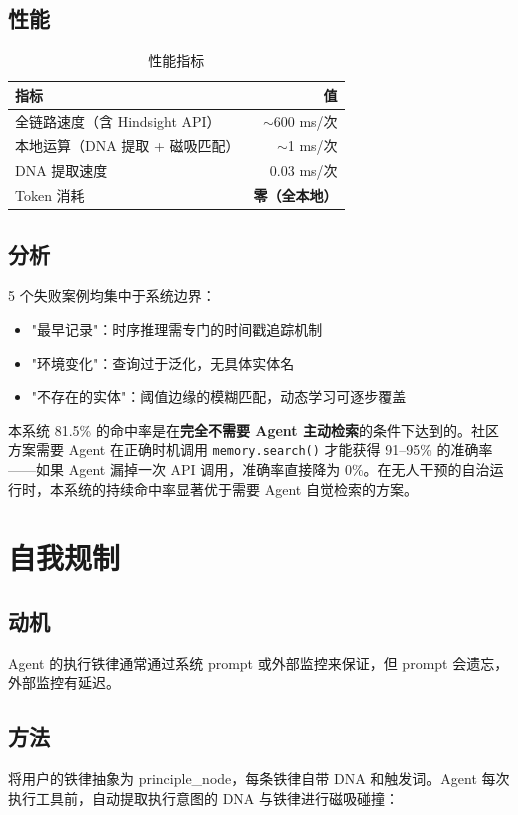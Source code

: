 \documentclass[11pt,a4paper]{article}
\begin{document}
\subsection{性能}

\begin{table}[ht]
\centering
\caption{性能指标}
\label{tab:perf}
\begin{tabular}{lr}
\toprule
指标 & 值 \\
\midrule
全链路速度（含 Hindsight API） & $\sim$600 ms/次 \\
本地运算（DNA 提取 + 磁吸匹配） & $\sim$1 ms/次 \\
DNA 提取速度 & 0.03 ms/次 \\
Token 消耗 & \textbf{零（全本地）} \\
\bottomrule
\end{tabular}
\end{table}

\subsection{分析}
5 个失败案例均集中于系统边界：

\begin{itemize}
  \item "最早记录"：时序推理需专门的时间戳追踪机制
  \item "环境变化"：查询过于泛化，无具体实体名
  \item "不存在的实体"：阈值边缘的模糊匹配，动态学习可逐步覆盖
\end{itemize}

本系统 81.5\% 的命中率是在\textbf{完全不需要 Agent 主动检索}的条件下达到的。社区方案需要 Agent 在正确时机调用 \texttt{memory.search()} 才能获得 91--95\% 的准确率——如果 Agent 漏掉一次 API 调用，准确率直接降为 0\%。在无人干预的自治运行时，本系统的持续命中率显著优于需要 Agent 自觉检索的方案。

\section{自我规制}

\subsection{动机}
Agent 的执行铁律通常通过系统 prompt 或外部监控来保证，但 prompt 会遗忘，外部监控有延迟。

\subsection{方法}
将用户的铁律抽象为 principle\_node，每条铁律自带 DNA 和触发词。Agent 每次执行工具前，自动提取执行意图的 DNA 与铁律进行磁吸碰撞：
\end{document}
